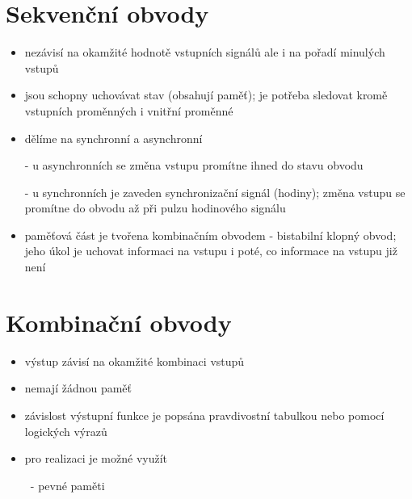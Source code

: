 \documentclass[a4paper,12pt]{article}
\begin{document}
\section{Sekvenční obvody}
    \begin{itemize}
        \item{nezávisí na okamžité hodnotě vstupních signálů ale i na pořadí minulých vstupů}
        \item{jsou schopny uchovávat stav (obsahují paměť); je potřeba sledovat kromě vstupních proměnných i vnitřní proměnné}
        \item{dělíme na synchronní a asynchronní}
            \item[-] u asynchronních se změna vstupu promítne ihned do stavu obvodu
            \item[-] u synchronních je zaveden synchronizační signál (hodiny); změna vstupu se promítne do obvodu až při pulzu hodinového signálu
        \item{paměťová část je tvořena kombinačním obvodem - bistabilní klopný obvod; jeho úkol je uchovat informaci na vstupu i poté, co informace na vstupu již není}
    \end{itemize}

\section{Kombinační obvody}
    \begin{itemize}
        \item{výstup závisí na okamžité kombinaci vstupů}
        \item{nemají žádnou paměť}
        \item{závislost výstupní funkce je popsána pravdivostní tabulkou nebo pomocí logických výrazů}
        \item{pro realizaci je možné využít}
            \item[\ -]{pevné paměti}
            
    \end{itemize}
\end{document}
